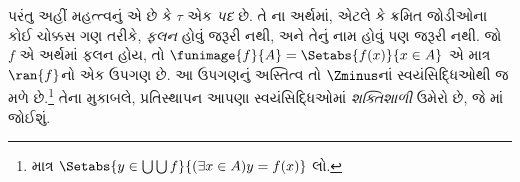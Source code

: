 \documentclass[../../../include/open-logic-section]{subfiles}
\begin{document}
પરંતુ અહીં મહત્ત્વનું એ છે કે $\tau$ એક \emph{પદ} છે. તે
ના અર્થમાં, એટલે કે ક્રમિત જોડીઓના
કોઈ ચોક્કસ ગણ તરીકે, \emph{ફલન} હોવું જરૂરી નથી, અને તેનું નામ
હોવું પણ જરૂરી નથી. જો $f$ એ અર્થમાં ફલન હોય, તો
$\funimage{f}{A} = \Setabs{f(x)}{x \in
A}$ એ માત્ર $\ran{f}$નો એક ઉપગણ છે. આ ઉપગણનું અસ્તિત્વ
તો $\Zminus$નાં સ્વયંસિદ્ધિઓથી જ મળે છે.\footnote{માત્ર
$\Setabs{y \in \bigcup \bigcup f}{(\exists x \in A)y =
f(x)}$ લો.} તેના મુકાબલે, પ્રતિસ્થાપન આપણા સ્વયંસિદ્ધિઓમાં
\emph{શક્તિશાળી} ઉમેરો છે, જે
માં જોઈશું.
\end{document}
